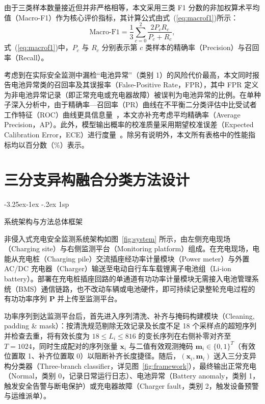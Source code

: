 \documentclass[12pt]{iopjournal}
\makeatletter
\renewcommand\subsection{\@startsection{subsection}{2}{\z@}%
                   {-3.25ex\@plus -1ex \@minus -.2ex}%
                   {1sp}%
                   {\reset@font\normalsize\bfseries\raggedright}}
\makeatother
\begin{document}
由于三类样本数量接近但并非严格相等，本文采用三类 F1 分数的非加权算术平均值（Macro-F1）作为核心评价指标，其计算公式由式~(\ref{eq:macrof1})所示：
\begin{equation}
\mathrm{Macro\mbox{-}F1}=\frac{1}{3}\sum_{c=0}^{2}\frac{2P_cR_c}{P_c+R_c},
\label{eq:macrof1}
\end{equation}
式~(\ref{eq:macrof1})中，$P_c$ 与 $R_c$ 分别表示第 $c$ 类样本的精确率（Precision）与召回率（Recall）。

考虑到在实际安全监测中漏检“电池异常”（类别 1）的风险代价最高，本文同时报告电池异常类的召回率及其误报率（False-Positive Rate，FPR），其中 FPR 定义为非电池异常记录（即正常充电或充电器故障）被误判为电池异常的比例。在单种子深入分析中，由于精确率—召回率（PR）曲线在不平衡二分类评估中比受试者工作特征（ROC）曲线更具信息量~\cite{saito2015}，本文亦补充考虑平均精确率（Average Precision，AP）。此外，模型输出概率的校准质量采用期望校准误差（Expected Calibration Error，ECE）进行度量~\cite{guo2017}。除另有说明外，本文所有表格中的性能指标均以百分数（\%）表示。

\section{三分支异构融合分类方法设计}\label{sec:method}

\subsection{系统架构与方法总体框架}

非侵入式充电安全监测系统架构如图~\ref{fig:system} 所示，由左侧充电现场（Charging site）与右侧监测平台（Monitoring platform）组成。在充电现场，电能从充电桩（Charging pile）交流插座经功率计量模块（Power meter）与外置 AC/DC 充电器（Charger）输送至电动自行车车载锂离子电池组（Li-ion battery）。部署在充电桩插座回路的单通道有功功率计量模块无需接入电池管理系统（BMS）通信链路，也不改动车辆或电池硬件，即可持续记录整轮充电过程的有功功率序列 $\bm{P}$ 并上传至监测平台。

功率序列到达监测平台后，首先进入序列清洗、补齐与掩码构建模块（Cleaning, padding \& mask）：按清洗规范剔除无效记录及长度不足 18 个采样点的超短序列并检查去重，将有效长度为 $18\le L_i\le 816$ 的变长序列在右侧补零对齐至 $T=1024$，同时生成配对的序列张量 $\bm{x}_i$ 与二值有效观测掩码 $\bm{m}_i\in\{0,1\}^T$（有效位置取 1、补齐位置取 0）以阻断补齐长度捷径。随后，$(\bm{x}_i,\bm{m}_i)$ 送入三分支异构分类器（Three-branch classifier，详见图~\ref{fig:framework}），最终输出正常充电（Normal，类别 0，记录日常运行日志）、电池异常（Battery anomaly，类别 1，触发安全告警与断电保护）或充电器故障（Charger fault，类别 2，触发设备预警与运维派单）。
\end{document}
